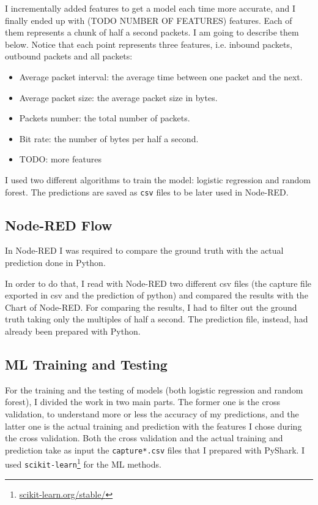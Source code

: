 I incrementally added features to get a model each time more accurate, and I finally ended up with (TODO NUMBER OF FEATURES) features. Each of them represents a chunk of half a second packets. I am going to describe them below. Notice that each point represents three features, i.e. inbound packets, outbound packets and all packets:
\begin{itemize}
    \item Average packet interval: the average time between one packet and the next.
    \item Average packet size: the average packet size in bytes.
    \item Packets number: the total number of packets.
    \item Bit rate: the number of bytes per half a second.
    \item TODO: more features
\end{itemize}

I used two different algorithms to train the model: logistic regression and random forest. The predictions are saved as \texttt{csv} files to be later used in Node-RED.

\subsection{Node-RED Flow}
In Node-RED I was required to compare the ground truth with the actual prediction done in Python.

In order to do that, I read with Node-RED two different csv files (the capture file exported in csv and the prediction of python) and compared the results with the Chart of Node-RED. For comparing the results, I had to filter out the ground truth taking only the multiples of half a second. The prediction file, instead, had already been prepared with Python.

\subsection{ML Training and Testing}
For the training and the testing of models (both logistic regression and random forest), I divided the work in two main parts. The former one is the cross validation, to understand more or less the accuracy of my predictions, and the latter one is the actual training and prediction with the features I chose during the cross validation. Both the cross validation and the actual training and prediction take as input the \texttt{capture*.csv} files that I prepared with PyShark. I used \texttt{scikit-learn}\footnote{\href{https://scikit-learn.org/stable/}{scikit-learn.org/stable/}} for the ML methods.

